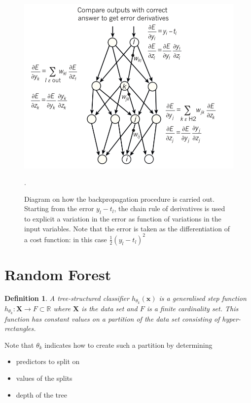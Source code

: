 \documentclass[a4paper,12pt]{article}
\newtheorem{definition}{Definition}[section]
\begin{document}
\begin{figure}
  \begin{minipage}[c]{0.65\textwidth}
    \includegraphics[width=\textwidth]{pictures/nnet_2.png}
  \end{minipage}\hfill
  \begin{minipage}[c]{0.35\textwidth}
    \caption{Diagram on how the backpropagation procedure is carried out. Starting from the error $y_{l}-t_{l}$, the chain rule of derivatives is used to explicit a variation in the error as function of variations in the input variables. Note that the error is taken as the differentiation of a cost function: in this case $\frac{1}{2} (y_{l}-t_{l})^{2}$}.
    \label{Figure::Nnet_2}
  \end{minipage}
\end{figure}

\section{Random Forest}

\begin{definition}
A tree-structured classifier $h_{\theta_{k} }(\textbf{x})$ is a generalised step function $h_{\theta_{k} }: \textbf{X} \rightarrow F \subset \mathbb{R}$ where $\textbf{X}$ is the data set and $F$ is a finite cardinality set. This function has constant values on a partition of the data set consisting of hyper-rectangles.
\end{definition}
Note that $\theta_{k}$ indicates how to create such a partition by determining 
\begin{itemize}
\item predictors to split on
\item values of the splits
\item depth of the tree
\end{itemize}
\end{document}
